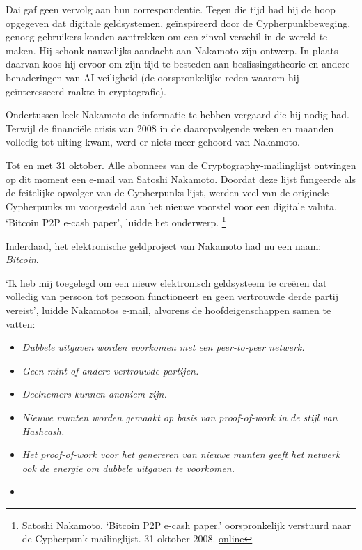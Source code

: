 \documentclass[smalldemyvopaper,11pt,twoside,onecolumn,openright,extrafontsizes,hidelinks]{memoir}
\begin{document}
Dai gaf geen vervolg aan hun correspondentie. Tegen die tijd had hij de
hoop opgegeven dat digitale geldsystemen, geïnspireerd door de
Cypherpunkbeweging, genoeg gebruikers konden aantrekken om een zinvol
verschil in de wereld te maken. Hij schonk nauwelijks aandacht aan
Nakamoto zijn ontwerp. In plaats daarvan koos hij ervoor om zijn tijd te
besteden aan beslissingstheorie en andere benaderingen van AI-veiligheid
(de oorspronkelijke reden waarom hij geïnteresseerd raakte in
cryptografie).

Ondertussen leek Nakamoto de informatie te hebben vergaard die hij nodig
had. Terwijl de financiële crisis van 2008 in de daaropvolgende weken en
maanden volledig tot uiting kwam, werd er niets meer gehoord van
Nakamoto.

Tot en met 31 oktober. Alle abonnees van de Cryptography-mailinglijst
ontvingen op dit moment een e-mail van Satoshi Nakamoto. Doordat deze
lijst fungeerde als de feitelijke opvolger van de Cypherpunks-lijst,
werden veel van de originele Cypherpunks nu voorgesteld aan het nieuwe
voorstel voor een digitale valuta. `Bitcoin P2P e-cash paper', luidde
het onderwerp. \footnote{Satoshi Nakamoto, `Bitcoin P2P e-cash paper.'
  oorspronkelijk verstuurd naar de Cypherpunk-mailinglijst. 31 oktober
  2008.
  \href{https://www.metzdowd.com/pipermail/cryptography/2008-October/014810.html}{online}}

Inderdaad, het elektronische geldproject van Nakamoto had nu een naam:
\emph{Bitcoin}.

`Ik heb mij toegelegd om een nieuw elektronisch geldsysteem te creëren
dat volledig van persoon tot persoon functioneert en geen vertrouwde
derde partij vereist', luidde Nakamotos e-mail, alvorens de
hoofdeigenschappen samen te vatten:

\begin{itemize}
\item
  \emph{Dubbele uitgaven worden voorkomen met een peer-to-peer netwerk.}
\item
  \emph{Geen mint of andere vertrouwde partijen.}
\item
  \emph{Deelnemers kunnen anoniem zijn.}
\item
  \emph{Nieuwe munten worden gemaakt op basis van proof-of-work in de
  stijl van Hashcash.}
\item
  \emph{Het proof-of-work voor het genereren van nieuwe munten geeft het
  netwerk ook de energie om dubbele uitgaven te voorkomen.}
\item
\end{itemize}
\end{document}
